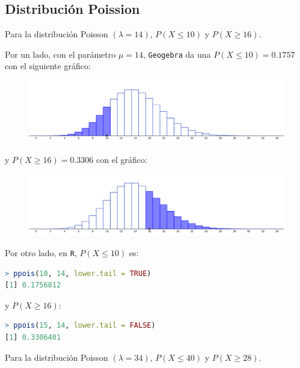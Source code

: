\subsection{Distribución Poission}
\begin{ejer}[1]
	 Para la distribución Poisson $(\lambda = 14)$, $P(X\leq 10)$ y $P(X\geq 16)$.
\end{ejer}
\begin{sol}
	Por un lado, con el parámetro $\mu=14$, \texttt{Geogebra} da una $P(X\leq 10) = 0.1757$ con el siguiente gráfico:
	\begin{figure}[H]
	\includegraphics[width=0.5\linewidth]{pics/g10-1}
	\centering
	\end{figure}\noindent
	y $P(X\geq 16) = 0.3306$ con el gráfico:
	\begin{figure}[H]
	\includegraphics[width=0.5\linewidth]{pics/g10-2}
	\centering
	\end{figure}\noindent
	Por otro lado, en \texttt{R}, $P(X\leq 10)$ es:
	\begin{lstlisting}[language=R]
> ppois(10, 14, lower.tail = TRUE)
[1] 0.1756812
	\end{lstlisting}
	y $P(X\geq 16)$:
		\begin{lstlisting}[language=R]
> ppois(15, 14, lower.tail = FALSE)
[1] 0.3306401
	\end{lstlisting}
\end{sol}
\begin{ejer}[1]
	Para la distribución Poisson $(\lambda = 34)$, $P(X \leq 40)$ y $P(X\geq 28)$.
\end{ejer}

